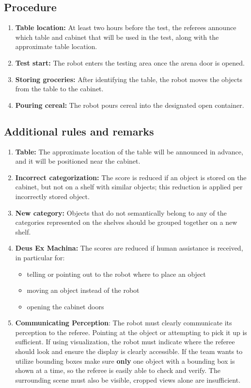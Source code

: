 \subsection*{Procedure}
\begin{enumerate}[nosep]
	\item \textbf{Table location:} At least two hours before the test, the referees announce which table and cabinet that will be used in the test, along with the approximate table location.
	\item \textbf{Test start:} The robot enters the testing area once the arena door is opened.
	\item \textbf{Storing groceries:} After identifying the table, the robot moves the objects from the table to the cabinet.
	\item \textbf{Pouring cereal:} The robot pours cereal into the designated open container.
\end{enumerate}


\subsection*{Additional rules and remarks}
\begin{enumerate}
	\item \textbf{Table:} The approximate location of the table will be announced in advance, and it will be positioned near the cabinet.
	\item \textbf{Incorrect categorization:} The score is reduced if an object is stored on the cabinet, but not on a shelf with similar objects; this reduction is applied per incorrectly stored object.
	\item \textbf{New category:} Objects that do not semantically belong to any of the categories represented on the shelves should be grouped together on a new shelf.
	\item \textbf{Deus Ex Machina:} The scores are reduced if human assistance is received, in particular for:
	\begin{itemize}
		\item telling or pointing out to the robot where to place an object
		\item moving an object instead of the robot
		\item opening the cabinet doors
	\end{itemize}
	\item \textbf{Communicating Perception}: The robot must clearly communicate its perception to the referee.
	Pointing at the object or attempting to pick it up is sufficient.
	If using visualization, the robot must indicate where the referee should look and ensure the display is clearly accessible.
	If the team wants to utilize bounding boxes make sure \textbf{only} one object with a bounding box is shown at a time, so the referee is easily able to check and verify.
	The surrounding scene must also be visible, cropped views alone are insufficient.
\end{enumerate}

